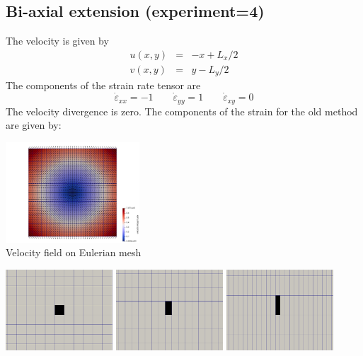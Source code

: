 \newpage
\subsection*{Bi-axial extension (experiment=4)}

The velocity is given by
\begin{eqnarray}
u(x,y)&=&-x+L_x/2 \\
v(x,y)&=&y-L_y/2
\end{eqnarray}
The components of the strain rate tensor are
\[
\dot\varepsilon_{xx} = -1 
\qquad
\dot\varepsilon_{yy} = 1
\qquad
\dot\varepsilon_{xy} = 0 
\]
The velocity divergence is zero. The components of the strain for the old method are given by:




\begin{center}
\includegraphics[width=5cm]{python_codes/fieldstone_89/results/biaxial/vel}\\
{\captionfont Velocity field on Eulerian mesh}
\end{center}


\begin{center}
\includegraphics[width=4cm]{python_codes/fieldstone_89/results/biaxial/target0000}
\includegraphics[width=4cm]{python_codes/fieldstone_89/results/biaxial/target0005}
\includegraphics[width=4cm]{python_codes/fieldstone_89/results/biaxial/target0010}
\end{center}

